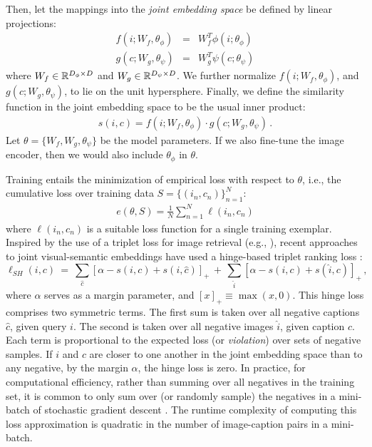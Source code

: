 Then, let the mappings into the {\em joint embedding space}\/ 
be defined by linear projections:
\begin{eqnarray}
    f(i; W_f, \theta_\phi) & = & W_f^T \phi(i; \theta_\phi)\\
    g(c; W_g, \theta_\psi) & = & W_g^T \psi(c; \theta_\psi) \end{eqnarray}
where $W_f\in\mathbb{R}^{D_\phi\times D}$ and $W_g\in\mathbb{R}^{D_\psi\times D}$.
We further normalize $f(i; W_f, \theta_\phi)$, and $g(c; W_g, \theta_\psi)$, 
to lie on the unit hypersphere.  Finally, we define the similarity 
function in the joint embedding space to be the usual inner product:
\begin{align}
s(i,c) = f(i; W_f, \theta_\phi)\cdot g(c; W_g, \theta_\psi)\,.
\end{align}
Let $\theta=\{W_f,W_g,\theta_\psi\}$ be the model parameters.  If we also
fine-tune the image encoder, then we would also include $\theta_\phi$ in 
$\theta$.

Training entails the minimization of empirical loss with respect to $\theta$, 
i.e., the cumulative loss over training data ${S=\{(i_n, c_n)\}^N_{n=1}}$:
\begin{eqnarray}
e(\theta, S)=\tfrac{1}{N}\sum^N_{n=1} \ell(i_n, c_n)
\end{eqnarray}
where $\ell(i_n, c_n)$ is a suitable loss function for a single training 
exemplar.
Inspired by the use of a triplet loss for image retrieval
(e.g., \cite{frome2007learning,chechik2010large}), recent approaches
to joint visual-semantic embeddings have used a hinge-based triplet ranking 
loss \cite{kiros2014unifying, karpathy2015deep, ZhuICCV15, 
socher2014grounded}:
\begin{equation}
    \ell_{SH}(i, c) ~=~
    \sum_{\hat{c}} [\alpha - s(i,c) + s(i,\hat{c})]_+ 
 \, +\, \sum_{\hat{i}} [\alpha - s(i,c) + s(\hat{i},c)]_+\,,
    \label{eq:contrastive}
\end{equation}
where $\alpha$ serves as a margin parameter, and $[x]_+ \equiv \max(x, 0)$.  
This hinge loss comprises two symmetric terms.  The first sum is taken over all 
negative captions $\hat{c}$, given query $i$.  The second is taken over all 
negative images $\hat{i}$, given caption $c$.  Each term is proportional to the 
expected loss (or {\em violation}\/) over sets of negative samples.  If $i$ and 
$c$ are closer to one another in the joint embedding space than to any 
negative, by the margin $\alpha$, the hinge loss is zero.  In practice, for 
computational efficiency, rather than summing over all  negatives in the 
training set, it is common to only sum over (or randomly sample) the negatives 
in a mini-batch of stochastic gradient descent \cite{kiros2014unifying, 
socher2014grounded, karpathy2015deep}.  The runtime complexity of computing 
this loss approximation is quadratic in the number of image-caption pairs in 
a mini-batch.

